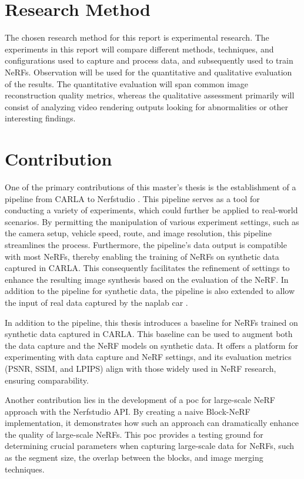 \section{Research Method}
The chosen research method for this report is experimental research. The experiments in this report will compare different methods, techniques, and configurations used to capture and process data, and subsequently used to train NeRFs. Observation will be used for the quantitative and qualitative evaluation of the results. The quantitative evaluation will span common image reconstruction quality metrics, whereas the qualitative assessment primarily will consist of analyzing video rendering outputs looking for abnormalities or other interesting findings.







\section{Contribution}
One of the primary contributions of this master's thesis is the establishment of a pipeline from CARLA \cite{Dosovitskiy17} to Nerfstudio \cite{nerfstudio}. This pipeline serves as a tool for conducting a variety of experiments, which could further be applied to real-world scenarios. By permitting the manipulation of various experiment settings, such as the camera setup, vehicle speed, route, and image resolution, this pipeline streamlines the process. Furthermore, the pipeline's data output is compatible with most NeRFs, thereby enabling the training of NeRFs on synthetic data captured in CARLA. This consequently facilitates the refinement of settings to enhance the resulting image synthesis based on the evaluation of the NeRF. In addition to the pipeline for synthetic data, the pipeline is also extended to allow the input of real data captured by the \acrfull{naplab} car \cite{naplab}.

In addition to the pipeline, this thesis introduces a baseline for NeRFs trained on synthetic data captured in CARLA. This baseline can be used to augment both the data capture and the NeRF models on synthetic data. It offers a platform for experimenting with data capture and NeRF settings, and its evaluation metrics (PSNR, SSIM, and LPIPS) align with those widely used in NeRF research, ensuring comparability.

Another contribution lies in the development of a \acrfull{poc} for large-scale NeRF approach with the Nerfstudio API. By creating a naive Block-NeRF implementation, it demonstrates how such an approach can dramatically enhance the quality of large-scale NeRFs. This \acrshort{poc} provides a testing ground for determining crucial parameters when capturing large-scale data for NeRFs, such as the segment size, the overlap between the blocks, and image merging techniques.

